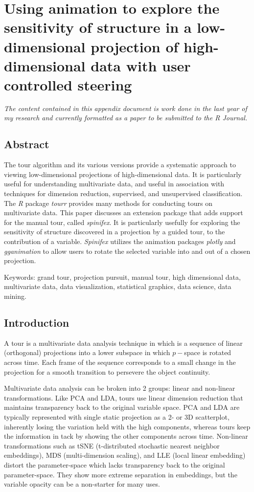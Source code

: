 \documentclass{monashthesis}
\begin{document}
\chapter{Using animation to explore the sensitivity of structure in a
low-dimensional projection of high-dimensional data with user controlled
steering}\label{ch:spinifex_paper}

\emph{The content contained in this appendix document is work done in
the last year of my research and currently formatted as a paper to be
submitted to the R Journal.}

\section{Abstract}\label{abstract-1}

The tour algorithm and its various versions provide a systematic
approach to viewing low-dimensional projections of high-dimensional
data. It is particularly useful for understanding multivariate data, and
useful in association with techniques for dimension reduction,
supervised, and unsupervised classification. The \emph{R} package
\emph{tourr} provides many methods for conducting tours on multivariate
data. This paper discusses an extension package that adds support for
the manual tour, called \emph{spinifex}. It is particularly usefully for
exploring the sensitivity of structure discovered in a projection by a
guided tour, to the contribution of a variable. \emph{Spinifex} utilizes
the animation packages \emph{plotly} and \emph{gganimation} to allow
users to rotate the selected variable into and out of a chosen
projection.

Keywords: grand tour, projection pursuit, manual tour, high dimensional
data, multivariate data, data visualization, statistical graphics, data
science, data mining.

\section{Introduction}\label{introduction}

A tour is a multivariate data analysis technique in which is a sequence
of linear (orthogonal) projections into a lower subspace in which
\(p-\)space is rotated across time. Each frame of the sequence
corresponds to a small change in the projection for a smooth transition
to persevere the object continuity.

Multivariate data analysis can be broken into 2 groups: linear and
non-linear transformations. Like PCA and LDA, tours use linear dimension
reduction that maintains transparency back to the original variable
space. PCA and LDA are typically represented with single static
projection as a 2- or 3D scatterplot, inherently losing the variation
held with the high components, whereas tours keep the information in
tack by showing the other components across time. Non-linear
transformations such as tSNE (t-distributed stochastic nearest neighbor
embeddings), MDS (multi-dimension scaling), and LLE (local linear
embedding) distort the parameter-space which lacks transparency back to
the original parameter-space. They show more extreme separation in
embeddings, but the variable opacity can be a non-starter for many uses.
\end{document}
